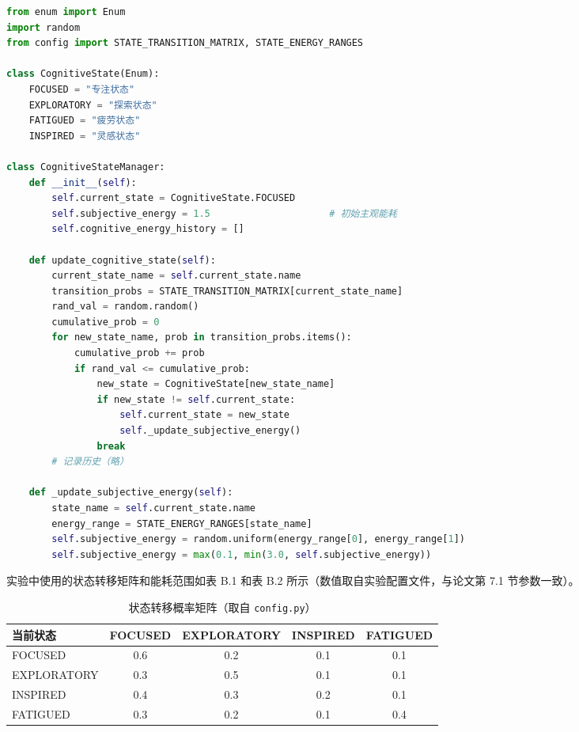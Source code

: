 \documentclass[12pt,a4paper]{article}
\begin{document}
\begin{lstlisting}[language=Python, caption={认知状态枚举与管理器（\texttt{cognitive\_states.py}）}, label=lst:state_manager]
from enum import Enum
import random
from config import STATE_TRANSITION_MATRIX, STATE_ENERGY_RANGES

class CognitiveState(Enum):
    FOCUSED = "专注状态"
    EXPLORATORY = "探索状态"
    FATIGUED = "疲劳状态"
    INSPIRED = "灵感状态"

class CognitiveStateManager:
    def __init__(self):
        self.current_state = CognitiveState.FOCUSED
        self.subjective_energy = 1.5                     # 初始主观能耗
        self.cognitive_energy_history = []

    def update_cognitive_state(self):
        current_state_name = self.current_state.name
        transition_probs = STATE_TRANSITION_MATRIX[current_state_name]
        rand_val = random.random()
        cumulative_prob = 0
        for new_state_name, prob in transition_probs.items():
            cumulative_prob += prob
            if rand_val <= cumulative_prob:
                new_state = CognitiveState[new_state_name]
                if new_state != self.current_state:
                    self.current_state = new_state
                    self._update_subjective_energy()
                break
        # 记录历史（略）

    def _update_subjective_energy(self):
        state_name = self.current_state.name
        energy_range = STATE_ENERGY_RANGES[state_name]
        self.subjective_energy = random.uniform(energy_range[0], energy_range[1])
        self.subjective_energy = max(0.1, min(3.0, self.subjective_energy))
\end{lstlisting}

实验中使用的状态转移矩阵和能耗范围如表 B.1 和表 B.2 所示（数值取自实验配置文件，与论文第 7.1 节参数一致）。

\begin{table}[H]
\centering
\caption{状态转移概率矩阵（取自 \texttt{config.py}）}
\label{tab:state_transition_app}
\begin{tabular}{lcccc}
\toprule
\textbf{当前状态} & \textbf{FOCUSED} & \textbf{EXPLORATORY} & \textbf{INSPIRED} & \textbf{FATIGUED} \\
\midrule
FOCUSED      & 0.6 & 0.2 & 0.1 & 0.1 \\
EXPLORATORY  & 0.3 & 0.5 & 0.1 & 0.1 \\
INSPIRED     & 0.4 & 0.3 & 0.2 & 0.1 \\
FATIGUED     & 0.3 & 0.2 & 0.1 & 0.4 \\
\bottomrule
\end{tabular}
\end{table}
\end{document}
